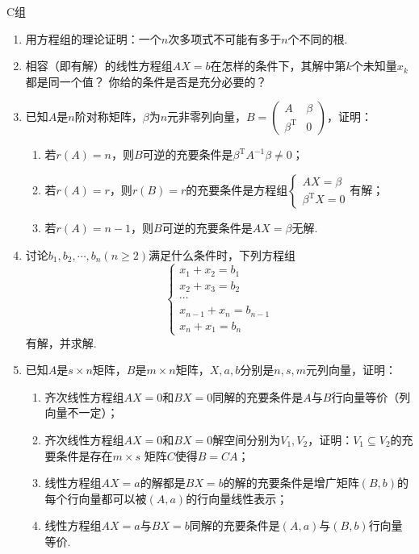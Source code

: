 \centerline{\heiti C组}
\begin{enumerate}
    \item 用方程组的理论证明：一个$n$次多项式不可能有多于$n$个不同的根.
    \item 相容（即有解）的线性方程组$AX=b$在怎样的条件下，其解中第$k$个未知量$x_k$都是同一个值？
    你给的条件是否是充分必要的？
    \item 已知$A$是$n$阶对称矩阵，$\beta$为$n$元非零列向量，$B=\begin{pmatrix}
		A & \beta \\ \beta^\mathrm{T} & 0
	\end{pmatrix}$，证明：
    \begin{enumerate}[label=(\arabic*)]
        \item 若$r(A)=n$，则$B$可逆的充要条件是$\beta^\mathrm{T}A^{-1}\beta \neq 0$；
        \item 若$r(A)=r$，则$r(B)=r$的充要条件是方程组$\begin{cases}
            AX=\beta \\ \beta^\mathrm{T}X=0
        \end{cases}$有解；
        \item 若$r(A)=n-1$，则$B$可逆的充要条件是$AX=\beta$无解.
    \end{enumerate}
    \item 讨论$b_1,b_2,\cdots,b_n(n\ge 2)$满足什么条件时，下列方程组$$\begin{cases}
		x_1+x_2=b_1 \\ x_2+x_3=b_2 \\ \cdots \\ x_{n-1}+x_n=b_{n-1} \\ x_n+x_1=b_n
	\end{cases}$$有解，并求解.
	\item 已知$A$是$s \times n$矩阵，$B$是$m \times n$矩阵，$X,a,b$分别是$n,s,m$元列向量，证明：
	\begin{enumerate}
        \item 齐次线性方程组$AX=0$和$BX=0$同解的充要条件是$A$与$B$行向量等价（列向量不一定）；
        \item 齐次线性方程组$AX=0$和$BX=0$解空间分别为$V_1,V_2$，证明：$V_1 \subseteq V_2$的充要条件是存在$m \times s$
        矩阵$C$使得$B=CA$；
        \item 线性方程组$AX=a$的解都是$BX=b$的解的充要条件是增广矩阵$(B,b)$的每个行向量都可以被$(A,a)$的行向量线性表示；
        \item 线性方程组$AX=a$与$BX=b$同解的充要条件是$(A,a)$与$(B,b)$行向量等价.
    \end{enumerate}
\end{enumerate}